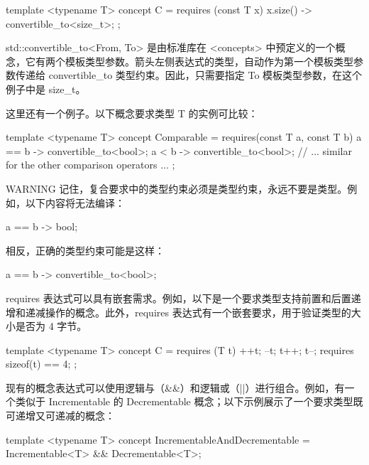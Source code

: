 \begin{cpp}
template <typename T>
concept C = requires (const T x) {
    { x.size() } -> convertible_to<size_t>;
};
\end{cpp}

std::convertible\_to<From, To> 是由标准库在 <concepts> 中预定义的一个概念，它有两个模板类型参数。箭头左侧表达式的类型，自动作为第一个模板类型参数传递给 convertible\_to 类型约束。因此，只需要指定 To 模板类型参数，在这个例子中是 size\_t。

这里还有一个例子。以下概念要求类型 T 的实例可比较：

\begin{cpp}
template <typename T>
concept Comparable = requires(const T a, const T b) {
    { a == b } -> convertible_to<bool>;
    { a < b } -> convertible_to<bool>;
    // ... similar for the other comparison operators ...
};
\end{cpp}

\begin{myWarning}{WARNING}
记住，复合要求中的类型约束必须是类型约束，永远不要是类型。例如，以下内容将无法编译：

\begin{cpp}
{ a == b } -> bool;
\end{cpp}

相反，正确的类型约束可能是这样：

\begin{cpp}
{ a == b } -> convertible_to<bool>;
\end{cpp}
\end{myWarning}


requires 表达式可以具有嵌套需求。例如，以下是一个要求类型支持前置和后置递增和递减操作的概念。此外，requires 表达式有一个嵌套要求，用于验证类型的大小是否为 4 字节。

\begin{cpp}
template <typename T>
concept C = requires (T t) {
    ++t; --t; t++; t--;
    requires sizeof(t) == 4;
};
\end{cpp}


现有的概念表达式可以使用逻辑与（\&\&）和逻辑或（||）进行组合。例如，有一个类似于 Incrementable 的 Decrementable 概念；以下示例展示了一个要求类型既可递增又可递减的概念：

\begin{cpp}
template <typename T>
concept IncrementableAndDecrementable = Incrementable<T> && Decrementable<T>;
\end{cpp}

